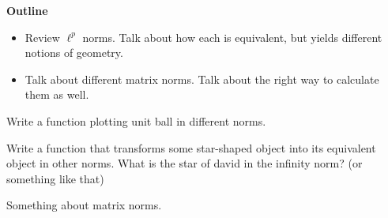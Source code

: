 

{\bf Outline}
\begin{itemize}
\item Review $\ell^p$ norms. Talk about how each is equivalent, but yields different notions of geometry.
\item Talk about different matrix norms. Talk about the right way to calculate them as well.
\end{itemize}
\begin{problem}
Write a function plotting unit ball in different norms.
\end{problem}

\begin{problem}
Write a function that transforms some star-shaped object into its equivalent object in other norms. What is the star of david in the infinity norm? (or something like that)
\end{problem}

\begin{problem}
Something about matrix norms.
\end{problem}
